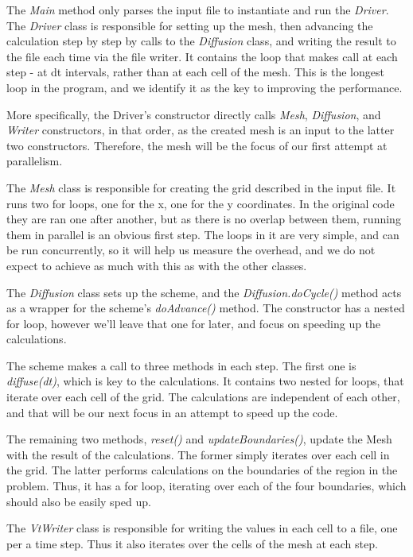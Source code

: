 \documentclass[11pt,journal]{IEEEtran}
\begin{document}
	The \emph{Main} method only parses the input file to instantiate and run the \emph{Driver}. The \emph{Driver} class is responsible for setting up the mesh, then advancing the calculation step by step by calls to the \emph{Diffusion} class, and writing the result to the file each time via the file writer. It contains the loop that makes call at each step - at dt intervals, rather than at each cell of the mesh. This is the longest loop in the program, and we identify it as the key to improving the performance.
	
	More specifically, the Driver's constructor directly calls \emph{Mesh}, \emph{Diffusion}, and \emph{Writer} constructors, in that order, as the created mesh is an input to the latter two constructors. Therefore, the mesh will be the focus of our first attempt at parallelism. 
	
	The \emph{Mesh} class is responsible for creating the grid described in the input file. It runs two for loops, one for the x, one for the y coordinates. In the original code they are ran one after another, but as there is no overlap between them, running them in parallel is an obvious first step. The loops in it are very simple, and can be run concurrently, so it will help us measure the overhead, and we do not expect to achieve as much with this as with the other classes.
	
	The \emph{Diffusion} class sets up the scheme, and the \emph{Diffusion.doCycle()} method acts as a wrapper for the scheme's \emph{doAdvance()} method. The constructor has a nested for loop, however we'll leave that one for later, and focus on speeding up the calculations.
	
	The scheme makes a call to three methods in each step. The first one is \emph{diffuse(dt)}, which is key to the calculations. It contains two nested for loops, that iterate over each cell of the grid. The calculations are independent of each other, and that will be our next focus in an attempt to speed up the code.
	
	The remaining two methods, \emph{reset()} and \emph{updateBoundaries()}, update the Mesh with the result of the calculations. The former simply iterates over each cell in the grid. The latter performs calculations on the boundaries of the region in the problem. Thus, it has a for loop, iterating over each of the four boundaries, which should also be easily sped up.
	
	The \emph{VtWriter} class is responsible for writing the values in each cell to a file, one per a time step. Thus it also iterates over the cells of the mesh at each step.
	
\end{document}
